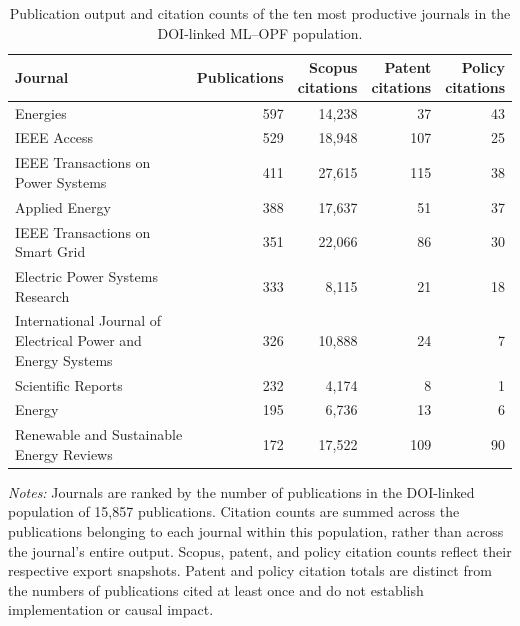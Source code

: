 \documentclass[a4paper,fleqn]{cas-sc}
\begin{document}
    \begin{table}[htbp]
    \centering
    \caption{Publication output and citation counts of the ten most productive journals in the DOI-linked ML--OPF population.}
    \label{tab:opf_leading_academic_sources}
    \scriptsize
    \setlength{\tabcolsep}{4pt}
    \renewcommand{\arraystretch}{1.15}
    \begin{tabularx}{\textwidth}{Xrrrr}
    \toprule
    Journal & Publications & \shortstack{Scopus\\citations} & \shortstack{Patent\\citations} & \shortstack{Policy\\citations} \\
    \midrule
    Energies & 597 & 14,238 & 37 & 43 \\
    IEEE Access & 529 & 18,948 & 107 & 25 \\
    IEEE Transactions on Power Systems & 411 & 27,615 & 115 & 38 \\
    Applied Energy & 388 & 17,637 & 51 & 37 \\
    IEEE Transactions on Smart Grid & 351 & 22,066 & 86 & 30 \\
    Electric Power Systems Research & 333 & 8,115 & 21 & 18 \\
    International Journal of Electrical Power and Energy Systems & 326 & 10,888 & 24 & 7 \\
    Scientific Reports & 232 & 4,174 & 8 & 1 \\
    Energy & 195 & 6,736 & 13 & 6 \\
    Renewable and Sustainable Energy Reviews & 172 & 17,522 & 109 & 90 \\
    \bottomrule
    \end{tabularx}
    \vspace{2mm}
    \begin{minipage}{\textwidth}
    \footnotesize
    \textit{Notes:} Journals are ranked by the number of publications in the DOI-linked population of 15,857 publications. Citation counts are summed across the publications belonging to each journal within this population, rather than across the journal's entire output. Scopus, patent, and policy citation counts reflect their respective export snapshots. Patent and policy citation totals are distinct from the numbers of publications cited at least once and do not establish implementation or causal impact.
    \end{minipage}
    \end{table}
    
\end{document}
